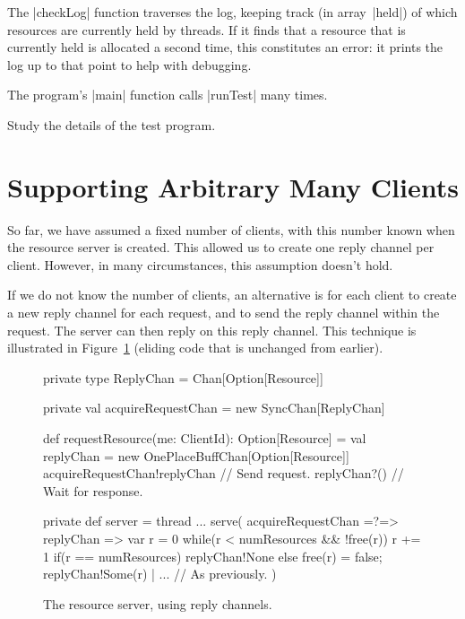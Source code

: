 The |checkLog| function traverses the log, keeping track (in array~|held|) of
which resources are currently held by threads.  If it finds that a resource
that is currently held is allocated a second time, this constitutes an error:
it prints the log up to that point to help with debugging.

The program's |main| function calls |runTest| many times. 

\begin{instruction}
Study the details of the test program.
\end{instruction}


\section{Supporting Arbitrary Many Clients}

So far, we have assumed a fixed number of clients, with this number known when
the resource server is created.  This allowed us to create one reply channel
per client.  However, in many circumstances, this assumption doesn't hold.

If we do not know the number of clients, an alternative is for each client to
create a new reply channel for each request, and to send the reply channel
within the request.  The server can then reply on this reply channel.  
%
This technique is illustrated in Figure~\ref{fig:RAServer-replyChan} (eliding
code that is unchanged from earlier). 


\begin{figure}
\begin{scala}
  private type ReplyChan = Chan[Option[Resource]]

  private val acquireRequestChan = new SyncChan[ReplyChan]

  def requestResource(me: ClientId): Option[Resource] = {
    val replyChan = new OnePlaceBuffChan[Option[Resource]]
    acquireRequestChan!replyChan  // Send request.
    replyChan?() // Wait for response.
  }

  private def server = thread{
    ...
    serve(
      acquireRequestChan =?=> { replyChan => 
	var r = 0
	while(r < numResources && !free(r)) r += 1
	if(r == numResources) replyChan!None
        else{ free(r) = false; replyChan!Some(r) }
      }
      | ... // As previously. 
    )
  }
\end{scala}
\caption{The resource server, using reply channels.}
\label{fig:RAServer-replyChan}
\end{figure}

